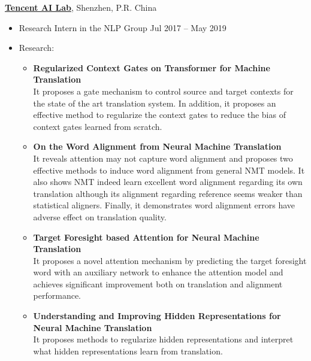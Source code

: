 {\bf \href{https://ai.tencent.com/ailab/en/index/}{Tencent AI Lab}}, Shenzhen, P.R. China
\begin{itemize}
    \item[] Research Intern in the NLP Group \hfill Jul 2017 -- May 2019
    \item[] Research:
    \begin{itemize}
        \item {\bf Regularized Context Gates on Transformer for Machine Translation}~\cite{li-etal-2020-regularized} \\
            It proposes a gate mechanism to control source and target contexts for the state of the art translation system.
            In addition, it proposes an effective method to regularize the context gates to reduce the bias of context gates learned from scratch.
        \item {\bf On the Word Alignment from Neural Machine Translation}~\cite{li-etal-2019-word} \\
            It reveals attention may not capture word alignment and proposes two effective methods to induce word alignment from general NMT models.
            It also shows NMT indeed learn excellent word alignment regarding its own translation although its alignment regarding reference seems weaker than statistical aligners.
            Finally, it demonstrates word alignment errors have adverse effect on translation quality.
        \item {\bf Target Foresight based Attention for Neural Machine Translation}~\cite{li-etal-2018-target, li2021attending} \\
            It proposes a novel attention mechanism by predicting the target foresight word with an auxiliary network to enhance the attention model and achieves significant improvement both on translation and alignment performance.
        \item {\bf Understanding and Improving Hidden Representations for Neural Machine Translation}~\cite{li-etal-2019-understanding-improving} \\
            It proposes methods to regularize hidden representations and interpret what hidden representations learn from translation.
    \end{itemize}
\end{itemize}


